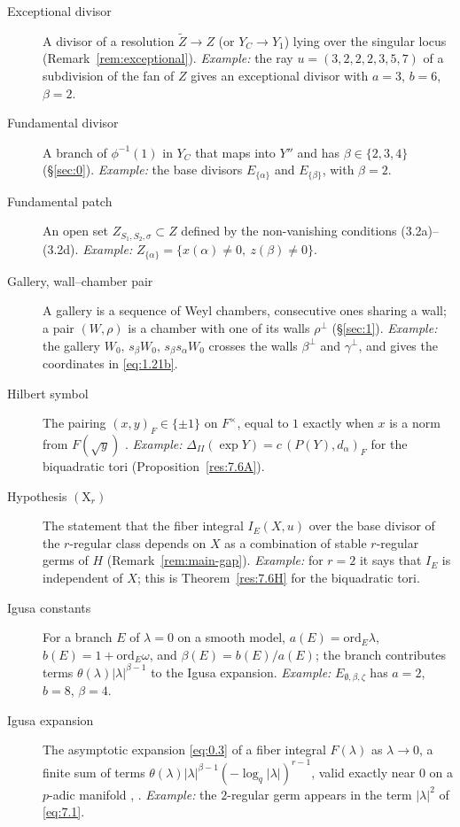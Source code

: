 \documentclass[12pt,letterpaper]{amsart}
\theoremstyle{plain}
\theoremstyle{definition}
\theoremstyle{remark}
\theoremstyle{definition}
\begin{document}
\begin{description}
\item[Exceptional divisor] A divisor of a resolution $\tilde Z\to Z$ (or
$Y_C\to Y_1$) lying over the singular locus (Remark~\ref{rem:exceptional}).
\emph{Example:} the ray $u=(3,2,2,2,3,5,7)$ of a subdivision of the fan of $Z$
gives an exceptional divisor with $a=3$, $b=6$, $\beta=2$.

\item[Fundamental divisor] A branch of $\phi^{-1}(1)$ in $Y_C$ that maps into
$Y''$ and has $\beta\in\{2,3,4\}$ (\S\ref{sec:0}). \emph{Example:} the base
divisors $E_{\{\alpha\}}$ and $E_{\{\beta\}}$, with $\beta=2$.

\item[Fundamental patch] An open set $Z_{S_1,S_2,\sigma}\subset Z$ defined by
the non-vanishing conditions (3.2a)--(3.2d). \emph{Example:}
$Z_{\{\alpha\}}=\{x(\alpha)\neq0,\ z(\beta)\neq0\}$.

\item[Gallery, wall--chamber pair] A gallery is a sequence of Weyl chambers,
consecutive ones sharing a wall; a pair $(W,\rho)$ is a chamber with one of its
walls $\rho^\perp$ (\S\ref{sec:1}). \emph{Example:} the gallery
$W_0,\,s_\beta W_0,\,s_\beta s_\alpha W_0$ crosses the walls $\beta^\perp$ and
$\gamma^\perp$, and gives the coordinates in \eqref{eq:1.21b}.

\item[Hilbert symbol] The pairing $(x,y)_F\in\{\pm1\}$ on $F^\times$, equal to
$1$ exactly when $x$ is a norm from $F(\sqrt y)$ \cite[Ch.~XIV]{Ser79}.
\emph{Example:} $\Delta_{II}(\exp Y)=c\,(P(Y),d_\alpha)_F$ for the biquadratic
tori (Proposition~\ref{res:7.6A}).

\item[Hypothesis $(\mathrm X_r)$] The statement that the fiber integral
$I_E(X,u)$ over the base divisor of the $r$-regular class depends on $X$ as a
combination of stable $r$-regular germs of $H$ (Remark~\ref{rem:main-gap}).
\emph{Example:} for $r=2$ it says that $I_E$ is independent of $X$; this is
Theorem~\ref{res:7.6H} for the biquadratic tori.

\item[Igusa constants] For a branch $E$ of $\lambda=0$ on a smooth model,
$a(E)=\mathrm{ord}_E\lambda$, $b(E)=1+\mathrm{ord}_E\omega$, and
$\beta(E)=b(E)/a(E)$; the branch contributes terms
$\theta(\lambda)|\lambda|^{\beta-1}$ to the Igusa expansion. \emph{Example:}
$E_{\emptyset,\beta,\zeta}$ has $a=2$, $b=8$, $\beta=4$.

\item[Igusa expansion] The asymptotic expansion \eqref{eq:0.3} of a fiber
integral $F(\lambda)$ as $\lambda\to0$, a finite sum of terms
$\theta(\lambda)|\lambda|^{\beta-1}(-\log_q|\lambda|)^{r-1}$, valid exactly near
$0$ on a $p$-adic manifold \cite{Ig78}, \cite{La83}. \emph{Example:} the $2$-regular
germ appears in the term $|\lambda|^2$ of \eqref{eq:7.1}.


\end{description}
\end{document}
